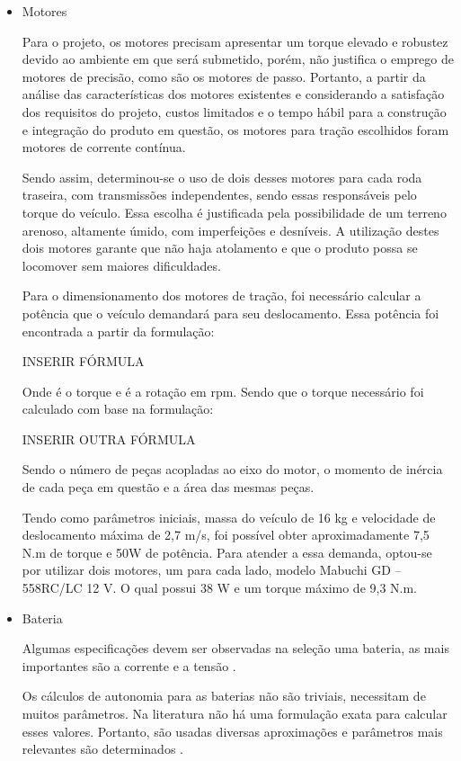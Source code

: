   \begin{itemize}
    \item Motores


    Para o projeto, os motores precisam apresentar um torque elevado e robustez
    devido ao ambiente em que será submetido, porém, não justifica o emprego de
    motores de precisão, como são os motores de passo. Portanto, a partir da
    análise das características dos motores existentes e considerando a satisfação
    dos requisitos do projeto, custos limitados e o tempo hábil para a construção
    e integração do produto em questão, os motores para tração escolhidos foram
    motores de corrente contínua.

    Sendo assim, determinou-se o uso de dois desses motores para cada roda
    traseira, com transmissões independentes, sendo essas responsáveis pelo torque
    do veículo. Essa escolha é justificada pela possibilidade de um terreno
    arenoso, altamente úmido, com imperfeições e desníveis. A utilização destes
    dois motores garante que não haja atolamento e que o produto possa se locomover sem
    maiores dificuldades.

    Para o dimensionamento dos motores de tração, foi necessário calcular a
    potência que o veículo demandará para seu deslocamento. Essa potência foi
    encontrada a partir da formulação:

      INSERIR FÓRMULA

    Onde  é o torque e  é a rotação em rpm. Sendo que o torque necessário foi calculado com base na formulação:

      INSERIR  OUTRA FÓRMULA

    Sendo  o número de peças acopladas ao eixo do motor,  o momento de inércia de cada peça em questão e  a área das mesmas peças.

    Tendo como parâmetros iniciais, massa do veículo de 16 kg e velocidade de deslocamento máxima de 2,7 m/s, foi possível obter aproximadamente 7,5 N.m de torque e 50W de potência. Para atender a essa demanda, optou-se por utilizar dois motores, um para cada lado, modelo Mabuchi GD – 558RC/LC 12 V. O qual possui 38 W e um torque máximo de 9,3 N.m.

    \item Bateria

    Algumas especificações devem ser observadas na seleção uma bateria, as mais importantes são a corrente e a
    tensão \cite{MAGALHAES}.

    Os cálculos de autonomia para as baterias não são triviais, necessitam de muitos parâmetros. Na literatura não
    há uma formulação exata para calcular esses valores. Portanto, são usadas diversas aproximações e parâmetros mais
    relevantes são determinados \cite{MEGGLIAR}.


\end{itemize}
